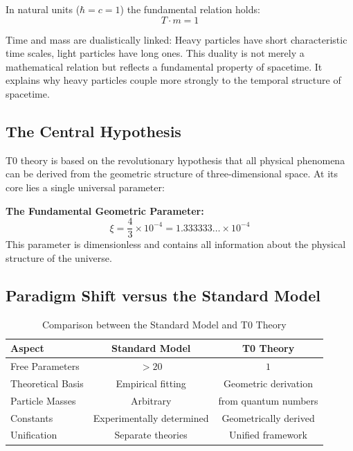	In natural units ($\hbar = c = 1$) the fundamental relation holds:
	\begin{equation}
		T \cdot m = 1
		\label{eq:time_mass_duality}
	\end{equation}
	
	Time and mass are dualistically linked: Heavy particles have short characteristic time scales, light particles have long ones. This duality is not merely a mathematical relation but reflects a fundamental property of spacetime. It explains why heavy particles couple more strongly to the temporal structure of spacetime.
	
	\subsection{The Central Hypothesis}
	
	T0 theory is based on the revolutionary hypothesis that all physical phenomena can be derived from the geometric structure of three-dimensional space. At its core lies a single universal parameter:
	
	\begin{foundation}
		\textbf{The Fundamental Geometric Parameter:}
		\begin{equation}
			\boxed{\xi = \frac{4}{3} \times 10^{-4} = 1.333333\dots \times 10^{-4}}
			\label{eq:xi_fundamental}
		\end{equation}
		This parameter is dimensionless and contains all information about the physical structure of the universe.
	\end{foundation}
	
	\subsection{Paradigm Shift versus the Standard Model}
	
	\begin{table}[htbp]
		\centering
		
		\begin{tabular}{lcc}
			\toprule
			\textbf{Aspect} & \textbf{Standard Model} & \textbf{T0 Theory} \\
			\midrule
			Free Parameters & $> 20$ & $1$ \\
			Theoretical Basis & Empirical fitting & Geometric derivation \\
			Particle Masses & Arbitrary & from quantum numbers \\
			Constants & Experimentally determined & Geometrically derived \\
			Unification & Separate theories & Unified framework \\
			\bottomrule
		\end{tabular}
		\caption{Comparison between the Standard Model and T0 Theory}
	\end{table}
	
